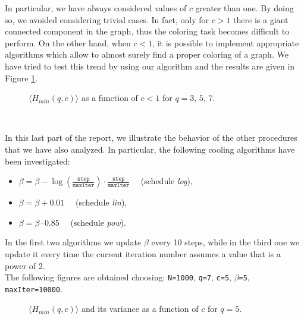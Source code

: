 In particular, we have always considered values of $c$ greater than one.
By doing so, we avoided considering trivial cases.
In fact, only for $c>1$ there is a giant connected component in the graph, thus the coloring task becomes difficult to perform.
On the other hand, when $c<1$, it is possible to implement appropriate algorithms which allow to almost surely find a proper coloring of a graph.
We have tried to test this trend by using our algorithm and the results are given in Figure \ref{fig:cpiccolo}.
\begin{figure}[h]
	\centering
	\setlength\figureheight{6cm} 		
	\setlength{}
	
	\vspace{-0.3cm}
	\caption{$\langle H_{min}(q,c)\rangle$ as a function of $c<1$ for $q=3,\,5,\,7.$}
	\label{fig:cpiccolo}
\end{figure}\\
\indent

In this last part of the report, we illustrate the behavior of the other procedures that we have also analyzed.
In particular, the following cooling algorithms have been investigated:
\begin{itemize}
	\item $\beta = \beta - \log\left(\frac{\texttt{step}}{\texttt{maxIter}}\right)\cdotp\frac{\texttt{step}}{\texttt{maxIter}}\quad$ (schedule \textsl{log}),
	\item $\beta = \beta + 0.01\quad$ (schedule \textsl{lin}),
	\item $\beta = \beta\cdotp0.85\quad$ (schedule \textsl{pow}).
\end{itemize}
In the first two algorithms we update $\beta$ every 10 steps, while in the third one we update it every time the current iteration number assumes a value that is a power of 2.\\
The following figures are obtained choosing: \texttt{N=1000}, \texttt{q=7}, \texttt{c=5}, \texttt{$\beta$=5}, \texttt{maxIter=10000}.

\begin{figure}[h]
	\centering
	\setlength\figureheight{6cm} 		
	\setlength{}
	
	\vspace{-0.3cm}
	\caption{$\langle H_{min}(q,c)\rangle$ and its variance as a function of $c$ for $q=5.$}
	\label{fig:schedules}
\end{figure}

%	


